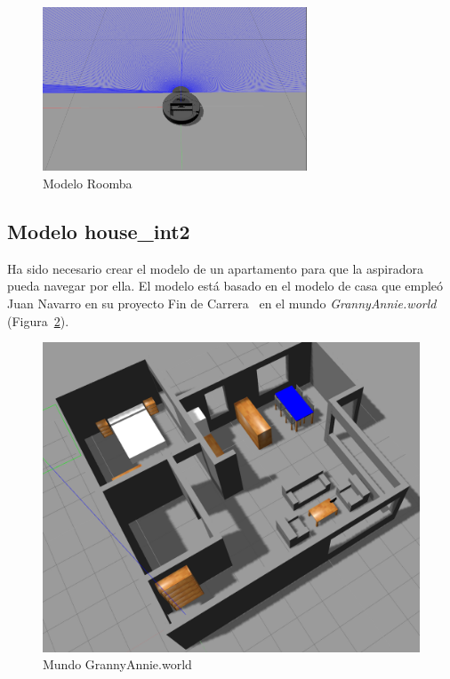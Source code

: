 \begin{figure}[H]
  \begin{center}
    \includegraphics[width=0.7\textwidth]{figures/Vacuum/vacuumModel.png}
		\caption{Modelo Roomba}
		\label{fig.vacuumModel}
		\end{center}
\end{figure}


\subsection{Modelo house\_int2}
Ha sido necesario crear el modelo de un apartamento para que la aspiradora pueda navegar por ella. El modelo está basado en el modelo de casa que empleó Juan Navarro en su proyecto Fin de Carrera~\cite{localization1} en el mundo \textit{GrannyAnnie.world} (Figura~\ref{fig.GrannyAnnie}).\\

\begin{figure}[H]
  \begin{center}
    \includegraphics[width=1.0\textwidth]{figures/Vacuum/GrannyAnnie.png}
		\caption{Mundo GrannyAnnie.world}
		\label{fig.GrannyAnnie}
		\end{center}
\end{figure}

